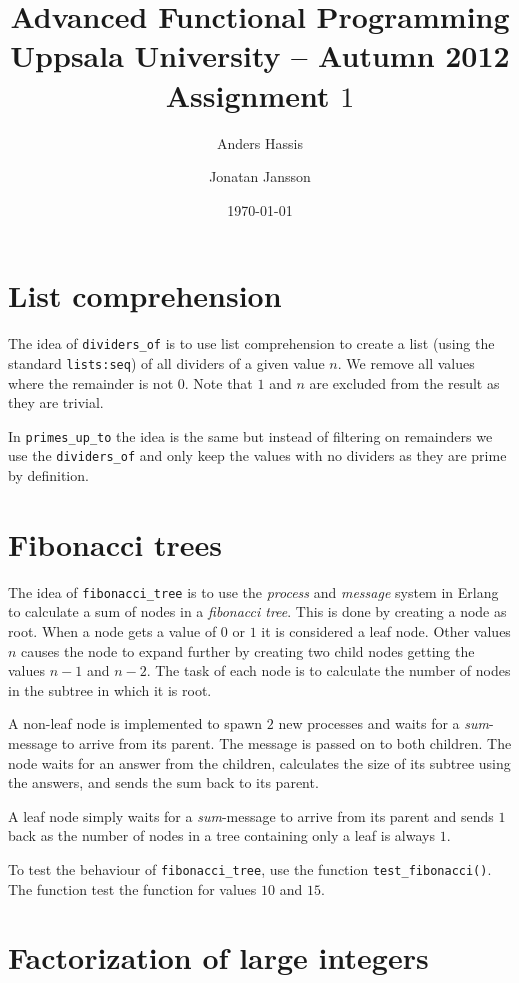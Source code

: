 \documentclass[a4paper,11pt]{article}
\title{\textbf{Advanced Functional Programming \\
    Uppsala University -- Autumn 2012 \\
    Assignment $1$ %
  }
}
\author{Anders Hassis \and Jonatan Jansson}
\date{\today}
\begin{document}
\maketitle

\section{List comprehension}

The idea of \texttt{dividers\_of} is to use list comprehension to create a list (using the standard \texttt{lists:seq}) of all dividers of a given value $n$. We remove all values where the remainder is not $0$. Note that $1$ and $n$ are excluded from the result as they are trivial.

In \texttt{primes\_up\_to} the idea is the same but instead of filtering on remainders we use the \texttt{dividers\_of} and only keep the values with no dividers as they are prime by definition.

\section{Fibonacci trees}

The idea of \texttt{fibonacci\_tree} is to use the \emph{process} and \emph{message} system in Erlang to calculate a sum of nodes in a \emph{fibonacci tree}. This is done by creating a node as root. When a node gets a value of $0$ or $1$ it is considered a leaf node. Other values $n$ causes the node to expand further by creating two child nodes getting the values $n-1$ and $n-2$. The task of each node is to calculate the number of nodes in the subtree in which it is root.

A non-leaf node is implemented to spawn $2$ new processes and waits for a \emph{sum}-message to arrive from its parent. The message is passed on to both children. The node waits for an answer from the children, calculates the size of its subtree using the answers, and sends the sum back to its parent.

A leaf node simply waits for a \emph{sum}-message to arrive from its parent and sends $1$ back as the number of nodes in a tree containing only a leaf is always $1$.

To test the behaviour of \texttt{fibonacci\_tree}, use the function \texttt{test\_fibonacci()}. The function test the function for values $10$ and $15$.

\section{Factorization of large integers}
\end{document}
